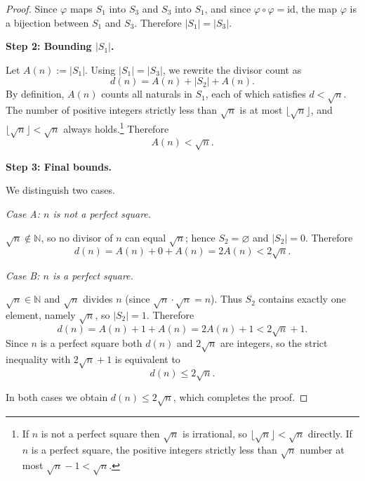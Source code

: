 \documentclass[12pt]{article}
\theoremstyle{remark}
\begin{document}
\begin{proof}
\medskip
Since $\varphi$ maps $S_1$ into $S_3$ and $S_3$ into $S_1$, and since
$\varphi \circ \varphi = \mathrm{id}$, the map $\varphi$ is a bijection
between $S_1$ and $S_3$.  Therefore $|S_1| = |S_3|$.

\bigskip
\noindent\textbf{Step 2: Bounding $|S_1|$.}

Let $A(n) := |S_1|$.  Using $|S_1| = |S_3|$, we rewrite the divisor count as
\[
    d(n) = A(n) + |S_2| + A(n).
\]
By definition, $A(n)$ counts all naturals in $S_1$, each of which satisfies
$d < \sqrt{n}$.  The number of positive integers strictly less than $\sqrt{n}$
is at most $\lfloor\sqrt{n}\rfloor$, and $\lfloor\sqrt{n}\rfloor < \sqrt{n}$
always holds.\footnote{%
  If $n$ is not a perfect square then $\sqrt{n}$ is irrational, so
  $\lfloor\sqrt{n}\rfloor < \sqrt{n}$ directly.
  If $n$ is a perfect square, the positive integers strictly less than
  $\sqrt{n}$ number at most $\sqrt{n}-1 < \sqrt{n}$.}
Therefore
\[
    A(n) < \sqrt{n}.
\]

\pagebreak
\noindent\textbf{Step 3: Final bounds.}

We distinguish two cases.

\medskip
\noindent\textit{Case A: $n$ is not a perfect square.}

$\sqrt{n} \notin \mathbb{N}$, so no divisor of $n$ can equal $\sqrt{n}$; hence
$S_2 = \varnothing$ and $|S_2| = 0$.  Therefore
\[
    d(n) = A(n) + 0 + A(n) = 2A(n) < 2\sqrt{n}.
\]

\medskip
\noindent\textit{Case B: $n$ is a perfect square.}

$\sqrt{n} \in \mathbb{N}$ and $\sqrt{n}$ divides $n$ (since
$\sqrt{n} \cdot \sqrt{n} = n$).  Thus $S_2$ contains exactly one element,
namely $\sqrt{n}$, so $|S_2| = 1$.  Therefore
\[
    d(n) = A(n) + 1 + A(n) = 2A(n) + 1 < 2\sqrt{n} + 1.
\]
Since $n$ is a perfect square both $d(n)$ and $2\sqrt{n}$ are integers, so
the strict inequality with $2\sqrt{n}+1$ is equivalent to
\[
    d(n) \leq 2\sqrt{n}.
\]

\medskip
\noindent In both cases we obtain $d(n) \leq 2\sqrt{n}$, which completes the
proof.
\end{proof}
\end{document}
